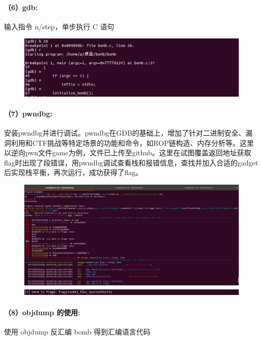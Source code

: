 \documentclass[a4paper, 12pt]{article}
\begin{document}
	\paragraph{（6）gdb:}	
	输入指令 n/step，单步执行 C 语句
	
	\begin{figure}[H]
		\centering
		\includegraphics[width=1\textwidth]{020.jpg}
	\end{figure}
	
	\paragraph{（7）pwndbg:}
	安装pwndbg并进行调试。pwndbg在GDB的基础上，增加了针对二进制安全、漏洞利用和CTF挑战等特定场景的功能和命令，如ROP链构造、内存分析等。这里以逆向pwn文件game为例，文件已上传至github。这里在试图覆盖返回地址获取flag时出现了段错误，用pwndbg调试查看栈和报错信息，查找并加入合适的gadget后实现栈平衡，再次运行，成功获得了flag。
	
	\begin{figure}[H]
		\centering
		\includegraphics[width=1\textwidth]{021.jpg}
		\includegraphics[width=1\textwidth]{022.jpg}
	\end{figure}
	
	\paragraph{（8）objdump 的使用:}
	使用 objdump 反汇编 bomb 得到汇编语言代码
\end{document}
